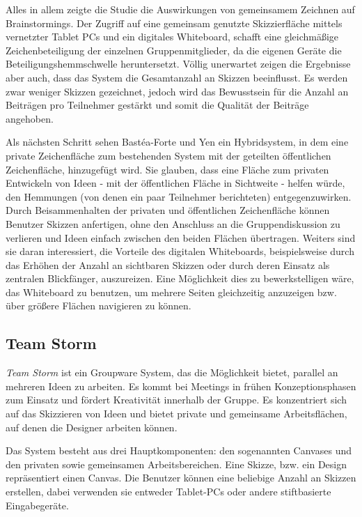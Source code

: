 \medskip Alles in allem zeigte die Studie die Auswirkungen von gemeinsamem Zeichnen auf Brainstormings. Der Zugriff auf eine gemeinsam genutzte Skizzierfläche mittels vernetzter Tablet PCs und ein digitales Whiteboard, schafft eine gleichmäßige Zeichenbeteiligung der einzelnen Gruppenmitglieder, da die eigenen Geräte die Beteiligungshemmschwelle heruntersetzt. Völlig unerwartet zeigen die Ergebnisse aber auch, dass das System die Gesamtanzahl an Skizzen beeinflusst. Es werden zwar weniger Skizzen gezeichnet, jedoch wird das Bewusstsein für die Anzahl an Beiträgen pro Teilnehmer gestärkt und somit die Qualität der Beiträge angehoben.

\medskip Als nächsten Schritt sehen Bastéa-Forte und Yen ein Hybridsystem, in dem eine private Zeichenfläche zum bestehenden System mit der geteilten öffentlichen Zeichenfläche, hinzugefügt wird. Sie glauben, dass eine Fläche zum privaten  Entwickeln von Ideen - mit der öffentlichen Fläche in Sichtweite - helfen würde, den Hemmungen (von denen ein paar Teilnehmer berichteten) entgegenzuwirken. Durch Beisammenhalten der privaten und öffentlichen Zeichenfläche können Benutzer Skizzen anfertigen, ohne den Anschluss an die Gruppendiskussion zu verlieren und Ideen einfach zwischen den beiden Flächen übertragen.
Weiters sind sie daran interessiert, die Vorteile des digitalen Whiteboards, beispielsweise durch das Erhöhen der Anzahl an sichtbaren Skizzen oder durch deren Einsatz als zentralen Blickfänger, auszureizen. Eine Möglichkeit dies zu bewerkstelligen wäre, das Whiteboard zu benutzen, um mehrere Seiten gleichzeitig anzuzeigen bzw. über größere Flächen navigieren zu können. \citep{Bastea-Forte:2007}

\subsection{Team Storm} 
\emph{Team Storm} \citep{Hailpern:2007p113} ist ein Groupware System, das die Möglichkeit bietet, parallel an mehreren Ideen zu arbeiten. Es kommt bei Meetings in frühen Konzeptionsphasen zum Einsatz und fördert Kreativität innerhalb der Gruppe. Es konzentriert sich auf das Skizzieren von Ideen und bietet private und gemeinsame Arbeitsflächen, auf denen die Designer arbeiten können.

Das System besteht aus drei Hauptkomponenten: den sogenannten Canvases und den privaten sowie gemeinsamen Arbeitsbereichen. Eine Skizze, bzw. ein Design repräsentiert einen Canvas. Die Benutzer können eine beliebige Anzahl an Skizzen erstellen, dabei verwenden sie entweder Tablet-PCs oder andere stiftbasierte Eingabegeräte. 

